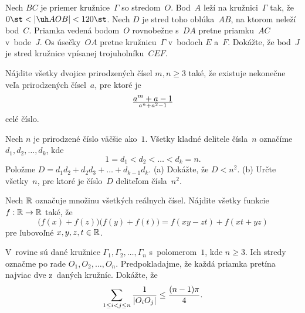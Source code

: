 {%
Nech $BC$ je priemer kružnice~${\Gamma}$ so stredom~$O$. Bod~$A$
leží na kružnici~$\Gamma$ tak, že $0\st<|\uh AOB|<120\st$.
Nech $D$ je stred toho oblúka~$AB$, na ktorom neleží bod~$C$.
Priamka vedená bodom~$O$ rovnobežne s~$DA$ pretne priamku~$AC$
v~bode~$J$. Os úsečky~$OA$ pretne kružnicu~$\Gamma$ v~bodoch $E$
a~$F$. Dokážte, že bod~$J$ je stred kružnice vpísanej trojuholníku~$CEF$.}

{%
Nájdite všetky dvojice prirodzených čísel $m,n\geq3$ také, že
existuje nekonečne veľa prirodzených čísel~$a$, pre ktoré je
$$
a^m+a-1\over a^n+a^2-1
$$
celé číslo.}

{%
Nech $n$ je prirodzené číslo väčšie ako~$1$. Všetky kladné delitele
čísla~$n$ označíme $d_1,d_2,\ldots,d_k$, kde
$$
1=d_1<d_2<\dots<d_k=n.
$$
Položme $D=d_1d_2+d_2d_3+\dots+d_{k-1}d_k$.
\ite(a) Dokážte, že $D<n^2$.
\ite(b) Určte všetky~$n$, pre ktoré je číslo~$D$ deliteľom
        čísla~$n^2$.}

{%
Nech $\Bbb R$ označuje množinu všetkých reálnych čísel. Nájdite všetky
funkcie $f:\Bbb R\to\Bbb R$ také, že
$$
\bigl(f(x)+f(z)\bigr)\bigl(f(y)+f(t)\bigr)=f(xy-zt)+f(xt+yz)
$$
pre ľubovoľné $x,y,z,t\in\Bbb R$.}

{%
V~rovine sú dané kružnice $\Gamma_1,\Gamma_2,\dots,\Gamma_n$
s~polomerom~$1$, kde $n\geq3$. Ich stredy označme po rade
$O_1,O_2,\dots,O_n$. Predpokladajme, že každá priamka pretína
najviac dve z~daných kružníc. Dokážte, že
$$
\sum_{1\leq i<j\leq n}{1\over |O_iO_j|}\leq{(n-1)\pi\over4}.
$$}

